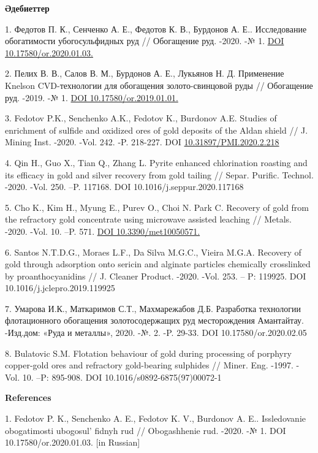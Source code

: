 {\bfseries Әдебиеттер}

1. Федотов П. К., Сенченко А. Е., Федотов К. В., Бурдонов А. Е..
Исследование обогатимости убогосульфидных руд // Обогащение руд. -2020.
-№ 1. \href{https://doi.org/10.17580/or.2020.01.03}{DOI
10.17580/or.2020.01.03.}

2. Пелих В. В., Салов В. М., Бурдонов А. Е., Лукьянов Н. Д. Применение
Knelson CVD-технологии для обогащения золото-свинцовой руды //
Обогащение руд. -2019. -№ 1.
\href{https://doi.org/10.17580/or.2019.01.01}{DOI
10.17580/or.2019.01.01.}

3. Fedotov P.K., Senchenko A.K., Fedotov K., Burdonov A.E. Studies of
enrichment of sulfide and oxidized ores of gold deposits of the Aldan
shield // J. Mining Inst. -2020. -Vol. 242. -P. 218-227. DOI
\href{https://doi.org/10.31897/PMI.2020.2.218}{10.31897/PMI.2020.2.218}

4. Qin H., Guo X., Tian Q., Zhang L. Pyrite enhanced chlorination
roasting and its efficacy in gold and silver recovery from gold tailing
// Separ. Purific. Technol. -2020. -Vol. 250. --P. 117168. DOI
10.1016/j.seppur.2020.117168

5. Cho K., Kim H., Myung E., Purev O., Choi N. Park C. Recovery of gold
from the refractory gold concentrate using microwave assisted leaching
// Metals. -2020. -Vol. 10. --P. 571.
\href{https://doi.org/10.3390/met10050571}{DOI 10.3390/met10050571.}

6. Santos N.T.D.G., Moraes L.F., Da Silva M.G.C., Vieira M.G.A. Recovery
of gold through adsorption onto sericin and alginate particles
chemically crosslinked by proanthocyanidins // J. Cleaner Product.
-2020. -Vol. 253. -- P: 119925. DOI 10.1016/j.jclepro.2019.119925

7. Умарова И.К., Маткаримов С.Т., Махмарежабов Д.Б. Разработка
технологии флотационного обогащения золотосодержащих руд месторождения
Амантайтау. -Изд.дом: «Руда и металлы», 2020. -№. 2. -P. 29-33. DOI
10.17580/or.2020.02.05

8. Bulatovic S.M. Flotation behaviour of gold during processing of
porphyry copper-gold ores and refractory gold-bearing sulphides //
Miner. Eng. -1997. -Vol. 10. --P: 895-908. DOI
10.1016/s0892-6875(97)00072-1

{\bfseries References}

1. Fedotov P. K., Senchenko A. E., Fedotov K. V., Burdonov A. E..
Issledovanie obogatimosti ubogosul' fidnyh rud //
Obogashhenie rud. -2020. -№ 1. DOI 10.17580/or.2020.01.03. {[}in
Russian{]}

